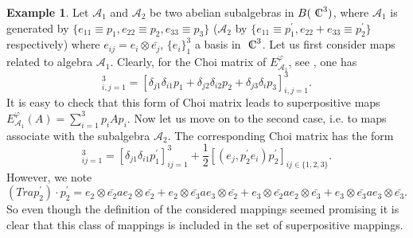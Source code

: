 \documentclass{amsart}
\theoremstyle{plain}
\theoremstyle{definition}
\newtheorem{exmp}[thm]{Example}
\newcommand{\cA}{\mathcal{A}}
\newcommand{\Cn}{{\setbox0=\hbox{
$\displaystyle\rm C$}\hbox{\hbox
to0pt{\kern0.6\wd0\vrule height0.9\ht0\hss}\box0}}} %
\begin{document}
\begin{exmp}
Let $\cA_1$ and $\cA_2$ be two abelian subalgebras in $B({\Cn}^3)$, where $\cA_1$ is generated by $\{e_{11} \equiv p_1, e_{22} \equiv p_2, 
e_{33}\equiv p_3 \}$ ($\cA_2$ by
$\{e_{11} \equiv p^{\prime}_1, e_{22}+e_{33} \equiv p^{\prime}_2 \}$ respectively) where $e_{ij} = e_i \otimes \bar{e_j}$, $\{e_i\}_1^3$ a basis in $\Cn^3$. Let us first consider maps related to algebra $\cA_1$.
Clearly, for the Choi matrix of $E^{\varphi}_{\cA_1}$, see \cite{Choi}, one has
\begin{equation}
[E^{\varphi}_{\cA_1}(e_{ij})]_{i,j=1}^3 =  [\delta_{j1} \delta_{i1} p_1 + \delta_{j2} \delta_{i2} p_2 + \delta_{j3} \delta_{i} p_3 ]_{i,j=1}^3.  
\end{equation}
It is easy to check that this form of Choi matrix  leads to superpositive maps $E^{\varphi}_{\cA_1}(A) = \sum_{i=1}^3 p_iAp_i$.
Now let us move on to the second case, i.e.  to maps associate with the subalgebra $\cA_2$.
The corresponding Choi matrix has the form
\begin{equation}
[E^{\varphi}_{\cA_2}(e_{ij})]_{ij=1}^3 =  [\delta_{j1} \delta_{i1} p_1^{\prime}]_{ij=1}^3 + \frac{1}{2} [(e_j, p_2^{\prime} e_i) p_2^{\prime}]_{ij \in \{1, 2,3\}}.
\end{equation}
However,  we note
\begin{equation}
(Trap_2^{\prime}) \cdot p_2^{\prime} = e_2 \otimes \bar{e_2} a e_2 \otimes \bar{e_2} + e_2 \otimes \bar{e_3}a e_3 \otimes \bar{e_2} + e_3 \otimes \bar{e_2}ae_2 \otimes \bar{e_3} + e_3 \otimes \bar{e_3}ae_3 \otimes \bar{e_3}.
\end{equation}
So even though the definition of the considered mappings seemed promising it is clear that this class of mappings is included in the set of superpositive mappings.
\end{exmp}
\end{document}
